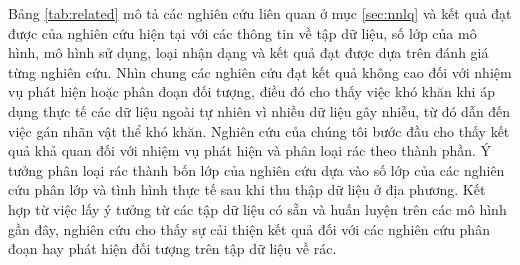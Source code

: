 \documentclass[../the.tex]{subfiles}
\begin{document}
{\fontsize{13}{12} \selectfont
    Bảng \ref{tab:related} 
    mô tả các nghiên cứu liên quan ở mục \ref{sec:nnlq} và kết quả đạt được của nghiên cứu hiện tại với các thông tin về tập dữ liệu, số lớp của mô hình, mô hình sử dụng, loại nhận dạng và kết quả đạt được dựa trên đánh giá từng nghiên cứu.
    Nhìn chung các nghiên cứu đạt kết quả không cao đối với nhiệm vụ phát hiện hoặc phân đoạn đối tượng, điều đó cho thấy việc khó khăn khi áp dụng thực tế các dữ liệu ngoài tự nhiên vì nhiều dữ liệu gây nhiễu,
    từ đó dẫn đến việc gán nhãn vật thể khó khăn.
    Nghiên cứu của chúng tôi bước đầu cho thấy kết quả khả quan đối với nhiệm vụ phát hiện và phân loại rác theo thành phần. 
    Ý tưởng phân loại rác thành bốn lớp của nghiên cứu dựa vào số lớp của các nghiên cứu phân lớp và tình hình thực tế sau khi thu thập dữ liệu ở địa phương. Kết hợp từ việc lấy ý tưởng từ các tập dữ liệu có sẵn và huấn luyện trên các mô hình gần đây,
    nghiên cứu cho thấy sự cải thiện kết quả đối với các nghiên cứu phân đoạn hay phát hiện đối tượng trên tập dữ liệu về rác.
}
\end{document}
